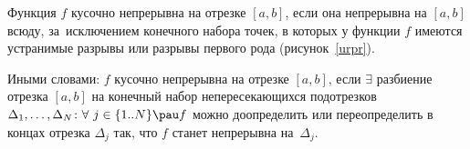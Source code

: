 
 	Функция $f$ кусочно непрерывна на отрезке $[a,b]$, если она непрерывна на $[a,b]$ всюду, за~исключением
 	конечного набора точек, в которых у функции $f$ имеются устранимые разрывы или разрывы первого рода (рисунок~\ref{urpr}).
 	
 	
 	Иными словами: $f$ кусочно непрерывна на отрезке $[a,b]$, если $\exists$ разбиение отрезка $[a,b]$ на конечный набор
 	непересекающихся подотрезков $\Delta_1,\ldots,\Delta_N\colon\forall\  j\in\{1..N\}\pau f$ можно
 	доопределить или переопределить в концах отрезка $\Delta_j$ так, что $f$ станет непрерывна на~$\Delta_j$.
 